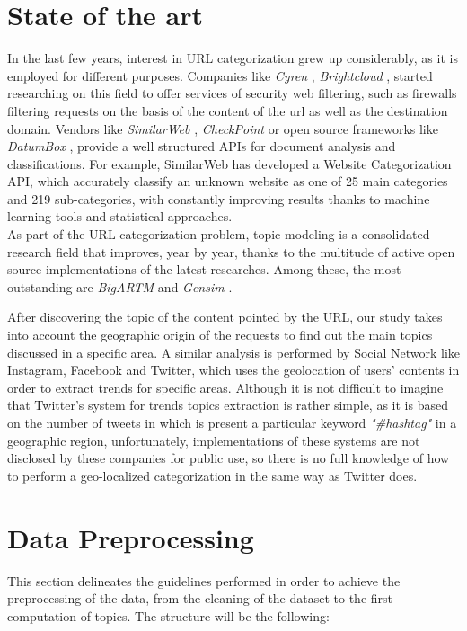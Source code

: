 \section{State of the art}

In the last few years, interest in URL categorization grew up considerably, as it is employed for different purposes. Companies like \emph{Cyren} \cite{cyren}, \emph{Brightcloud} \cite{bc}, started researching on this field to offer services of security web filtering, such as firewalls filtering requests on the basis of the content of the url as well as the destination domain. Vendors like \emph{SimilarWeb} \cite{sw}, \emph{CheckPoint} \cite{cp} or open source frameworks like \emph{DatumBox} \cite{db}, provide a well structured APIs for document analysis and classifications. For example, SimilarWeb has developed a Website Categorization API, which accurately classify an unknown website as one of 25 main categories and 219 sub-categories, with constantly improving results thanks to machine learning tools and statistical approaches.\\

As part of the URL categorization problem, topic modeling is a consolidated research field that improves, year by year, thanks to the multitude of active open source implementations of the latest researches. Among these, the most outstanding are \emph{BigARTM} \cite{ba} and \emph{Gensim} \cite{gensim}. 

After discovering the topic of the content pointed by the URL, our study takes into account the geographic origin of the requests to find out the main topics discussed in a specific area.
A similar analysis is performed by Social Network like Instagram, Facebook and Twitter, which uses the geolocation of users' contents in order to extract trends for specific areas. Although it is not difficult to imagine that Twitter's system for trends topics extraction is rather simple, as it is based on the number of tweets in which is present a particular keyword \emph{"\#hashtag"} in a geographic region, unfortunately, implementations of these systems are not disclosed by these companies for public use, so there is no full knowledge of how to perform a geo-localized categorization in the same way as Twitter does.

\section{Data Preprocessing}

This section delineates the guidelines performed in order to achieve the preprocessing of the data, from the cleaning of the dataset to the first computation of topics. The structure will be the following:\\

